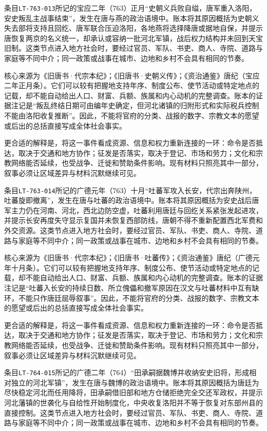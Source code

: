 条目\texttt{LT-763-013}所记的宝应二年（763）正月“史朝义兵败自缢，唐军重入洛阳，安史叛乱主战事结束”，发生在唐与燕的政治语境中。账本将其原因概括为史朝义失去部将支持且回纥、唐军联合压迫洛阳，各地燕将选择降唐或据地自保，并提示唐恢复两京的名义统一，却承认或容纳一批河北军镇，战后权力结构并未回到天宝旧制。这类节点进入地方社会时，要经过官员、军队、书吏、商人、寺院、道路与家庭等不同中介；同一政策或战事在城市、边地和乡村不会具有相同的节奏。

核心来源为《旧唐书·代宗本纪》；《旧唐书·史朝义传》；《资治通鉴》唐纪（宝应二年正月条）。它们可以较有把握地支持年序、制度公布、使节活动或特定地点的记载，却不能自动给出人口、财富、兵额、族属和内心动机的完整调查。账本的证据注记是“叛乱终结日期可由编年史确定，但河北诸镇的归附形式和实际税兵控制不能由洛阳收复推断”。因此，不能将官府的分类、战报的数字、宗教文本的愿望或后出的总括直接写成全体社会事实。

更合适的解释是，将这一事件看成资源、信息和权力重新连接的一环：命令是否抵达，取决于交通和地方协作；征发是否落实，取决于登记、市场和劳力；文化和宗教网络能否延续，也受战争、迁徙和赞助条件影响。现有材料只照亮其中一部分，叙事必须让区域差异与材料沉默继续可见。

条目\texttt{LT-763-014}所记的广德元年（763）十月“吐蕃军攻入长安，代宗出奔陕州，吐蕃旋即撤离”，发生在唐与吐蕃的政治语境中。账本将其原因概括为安史战后唐军主力仍在河南、河北，西北边防空虚，吐蕃利用唐廷与回纥关系紧张发起进攻，并提示长安再度失守显示复国并未恢复西部防线，唐朝不得不重新配置西北军费和外交资源。这类节点进入地方社会时，要经过官员、军队、书吏、商人、寺院、道路与家庭等不同中介；同一政策或战事在城市、边地和乡村不会具有相同的节奏。

核心来源为《旧唐书·代宗本纪》；《旧唐书·吐蕃传》；《资治通鉴》唐纪（广德元年十月条）。它们可以较有把握地支持年序、制度公布、使节活动或特定地点的记载，却不能自动给出人口、财富、兵额、族属和内心动机的完整调查。账本的证据注记是“吐蕃入长安的持续日数、所立傀儡和撤军原因在汉文与吐蕃材料中互有缺环，不能只作唐廷屈辱叙事”。因此，不能将官府的分类、战报的数字、宗教文本的愿望或后出的总括直接写成全体社会事实。

更合适的解释是，将这一事件看成资源、信息和权力重新连接的一环：命令是否抵达，取决于交通和地方协作；征发是否落实，取决于登记、市场和劳力；文化和宗教网络能否延续，也受战争、迁徙和赞助条件影响。现有材料只照亮其中一部分，叙事必须让区域差异与材料沉默继续可见。

条目\texttt{LT-764-015}所记的广德二年（764）“田承嗣据魏博并收纳安史旧将，形成相对独立的河北军镇”，发生在唐与魏博的政治语境中。账本将其原因概括为唐廷为尽快稳定河北而任用降将，田承嗣借旧部和地方仓储拒绝完全交还军政权，并提示河北藩镇的世袭化与自给性开始制度化，中央收复洛阳并不等于恢复对东部州县的直接控制。这类节点进入地方社会时，要经过官员、军队、书吏、商人、寺院、道路与家庭等不同中介；同一政策或战事在城市、边地和乡村不会具有相同的节奏。

